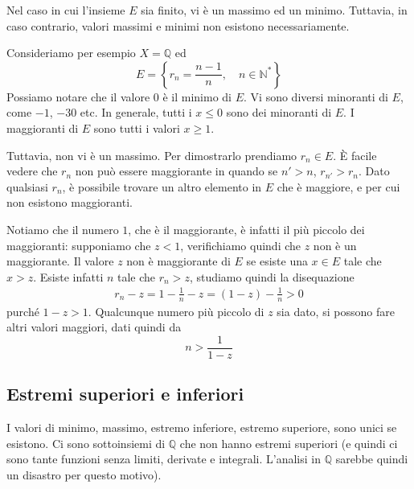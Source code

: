 \documentclass[a4paper]{article}
\begin{document}
Nel caso in cui l'insieme \(E\) sia finito, vi è un massimo ed un minimo.
Tuttavia, in caso contrario, valori massimi e minimi non esistono necessariamente.

Consideriamo per esempio \(X=\mathbb{Q}\) ed
\[
    E = \left\{ r_n = \frac{n-1}{n}, \quad n\in{\mathbb{N}}^* \right\}
\]
Possiamo notare che il valore \(0\) è il minimo di \(E\).
Vi sono diversi minoranti di \(E\), come \(-1\), \(-30\) etc. In generale, tutti i \(x\leq 0\) sono
dei minoranti di \(E\).
I maggioranti di \(E\) sono tutti i valori \( x \geq 1\).

Tuttavia, non vi è un massimo. Per dimostrarlo prendiamo \(r_n \in E\).
È facile vedere che \(r_n\) non può essere maggiorante in quando se \(n'>n\), \(r_{n'}>r_n\).
Dato qualsiasi \(r_n\), è possibile trovare un altro elemento in \(E\) che è maggiore, e per cui non
esistono maggioranti.

Notiamo che il numero \(1\), che è il maggiorante, è infatti il più piccolo dei maggioranti:
supponiamo che \(z<1\), verifichiamo quindi che \(z\) non è un maggiorante.
Il valore \(z\) non è maggiorante di \(E\) se esiste una \(x \in E\) tale che \(x > z\).
Esiste infatti \(n\) tale che \(r_n > z\), studiamo quindi la disequazione
\begin{align*}
    r_n - z = 1 - \frac{1}{n} - z = (1-z) - \frac{1}{n} > 0
\end{align*}
purché \(1-z>1\). Qualcunque numero più piccolo di \(z\) sia dato, si possono fare
altri valori maggiori, dati quindi da
\[
    n > \frac{1}{1-z}
\]

\pagebreak

\subsection{Estremi superiori e inferiori}



I valori di minimo, massimo, estremo inferiore, estremo superiore, sono unici se esistono.
Ci sono sottoinsiemi di \(\mathbb{Q}\) che non hanno estremi superiori (e quindi ci sono tante funzioni senza limiti, derivate e integrali.
L'analisi in \(\mathbb{Q}\) sarebbe quindi un disastro per questo motivo).
\end{document}
